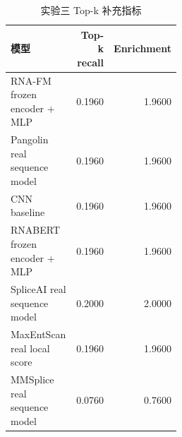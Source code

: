 \documentclass[
    oneside,
    fontset = win,
  ]{njuthesis}
\begin{document}
\begin{table}[H]
  \centering
  \caption{实验三 Top-k 补充指标}
  \label{tab:appendix-topk}
  \begin{tabular}{>{\raggedright\arraybackslash}p{0.48\linewidth}rr}
    \hline
    模型 & Top-k recall & Enrichment \\
    \hline
    RNA-FM frozen encoder + MLP & 0.1960 & 1.9600 \\
    Pangolin real sequence model & 0.1960 & 1.9600 \\
    CNN baseline & 0.1960 & 1.9600 \\
    RNABERT frozen encoder + MLP & 0.1960 & 1.9600 \\
    SpliceAI real sequence model & 0.2000 & 2.0000 \\
    MaxEntScan real local score & 0.1960 & 1.9600 \\
    MMSplice real sequence model & 0.0760 & 0.7600 \\
    \hline
  \end{tabular}
\end{table}
\end{document}
